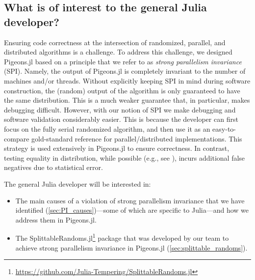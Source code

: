\subsection{What is of interest to the general Julia developer?}
Ensuring code correctness at the intersection of randomized, parallel, and 
distributed algorithms is a challenge. To address this challenge, we designed Pigeons.jl 
based on a principle that we refer to as \textit{strong parallelism invariance}
(SPI).
Namely, the output of Pigeons.jl is completely invariant to the number of machines 
and/or threads.
Without explicitly keeping SPI in mind during software construction, 
the (random) output of the algorithm is only guaranteed to have the same distribution.
This is a much weaker guarantee that, in particular, makes debugging difficult.
However, with our notion of SPI we make debugging and 
software validation considerably easier. This is because the developer can 
first focus on the fully serial randomized algorithm, and then use it as an 
easy-to-compare gold-standard reference for parallel/distributed implementations. 
This strategy is used extensively in Pigeons.jl to ensure correctness. In contrast, 
testing equality in distribution, while possible (e.g., see \cite{geweke2004getting}), 
incurs additional false negatives due to statistical error.

\medskip 
The general Julia developer will be interested in: 
\begin{itemize}
    \item The main causes of a violation of strong parallelism invariance that we have identified 
    (\cref{sec:PI_causes})---some of which are specific to Julia---and how we address 
    them in Pigeons.jl.

    \item The SplittableRandoms.jl\footnote{\url{https://github.com/Julia-Tempering/SplittableRandoms.jl}}
    package that was developed by our team 
    to achieve strong parallelism invariance in Pigeons.jl (\cref{sec:splittable_randoms}).
\end{itemize}
